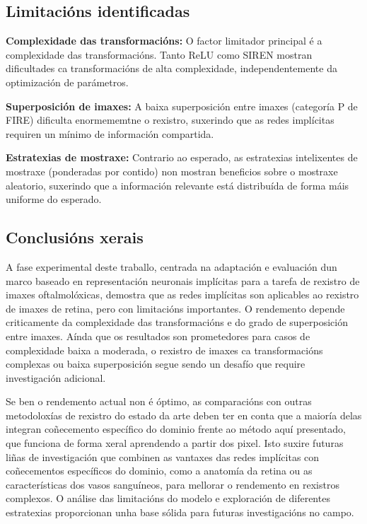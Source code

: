\subsection{Limitacións identificadas}
\label{subsec:Limitacións identificadas}

\textbf{Complexidade das transformacións:} O factor limitador principal é a complexidade das transformacións. Tanto ReLU como SIREN mostran dificultades ca transformacións de alta complexidade, independentemente da optimización de parámetros.

\textbf{Superposición de imaxes:} A baixa superposición entre imaxes (categoría P de FIRE) dificulta enormememtne o rexistro, suxerindo que as redes implícitas requiren un mínimo de información compartida.

\textbf{Estratexias de mostraxe:} Contrario ao esperado, as estratexias intelixentes de mostraxe (ponderadas por contido) non mostran beneficios sobre o mostraxe aleatorio, suxerindo que a información relevante está distribuída de forma máis uniforme do esperado.

\subsection{Conclusións xerais}
\label{subsec:Conclusións xerais}

A fase experimental deste traballo, centrada na adaptación e evaluación dun marco baseado en representación neuronais implícitas para a tarefa de rexistro de imaxes oftalmolóxicas,
demostra que as redes implícitas son aplicables ao rexistro de imaxes de retina, pero con limitacións importantes.
 O rendemento depende criticamente da complexidade das transformacións e do grado de superposición entre imaxes. Aínda que os resultados son prometedores para casos de complexidade baixa a moderada, o rexistro de imaxes ca transformacións complexas ou baixa superposición segue sendo un desafío que require investigación adicional.

Se ben o rendemento actual non é óptimo, as comparacións con outras metodoloxías de rexistro do estado da arte deben ter en conta que a maioría delas integran coñecemento específico do dominio frente ao método aquí presentado, que funciona de forma xeral aprendendo a partir dos pixel.
Isto suxire futuras liñas de investigación que combinen as vantaxes das redes implícitas con coñecementos específicos do dominio, como a anatomía da retina ou as características dos vasos sanguíneos, para mellorar o rendemento en rexistros complexos.
O análise das limitacións do modelo e exploración de diferentes estratexias proporcionan unha base sólida para futuras investigacións no campo. 